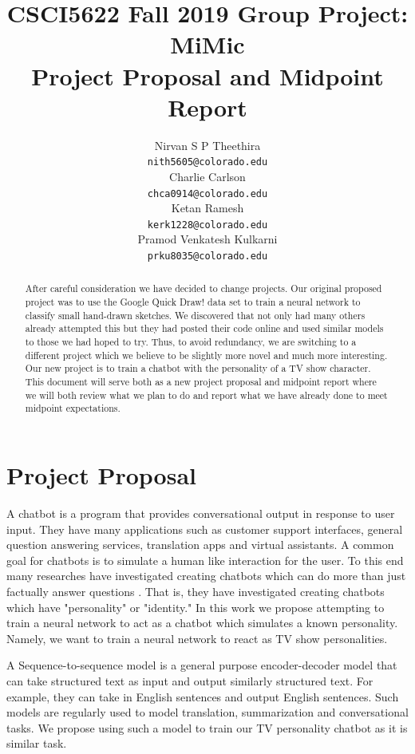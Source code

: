 \documentclass{article}
\title{CSCI5622 Fall 2019 Group Project: MiMic\\
       Project Proposal and Midpoint Report}
\author{%
  Nirvan S P Theethira\\
  \texttt{nith5605@colorado.edu} \\
  \And
  Charlie Carlson\\
  \texttt{chca0914@colorado.edu} \\
  \And
  Ketan Ramesh\\
  \texttt{kerk1228@colorado.edu} \\
  \And
  Pramod Venkatesh Kulkarni\\
  \texttt{prku8035@colorado.edu} \\
}
\begin{document}
 
\maketitle
 
\begin{abstract}
 After careful consideration we have decided to change projects.
 Our original proposed project was to use the Google Quick Draw! data set to train a neural network to classify small hand-drawn sketches.
 We discovered that not only had many others already attempted this but they had posted their code online and used similar models to those we had hoped to try.
 Thus, to avoid redundancy, we are switching to a different project which we believe to be slightly more novel and much more interesting. 
 Our new project is to train a chatbot with the personality of a TV show character.
 This document will serve both as a new project proposal and midpoint report where we will both review what we plan to do and report what we have already done to meet midpoint expectations.
\end{abstract}
 
\section{Project Proposal}
A chatbot is a program that provides conversational output in response to user input.
They have many applications such as customer support interfaces, general question answering services, translation apps and virtual assistants.
A common goal for chatbots is to simulate a human like interaction for the user.
To this end many researches have investigated creating chatbots which can do more than just factually answer questions \cite{Li2016, LINH2019, QianHZXZ17, ZhouHZZL17,NMC2017}.
That is, they have investigated creating chatbots which have "personality" or "identity."
In this work we propose attempting to train a neural network to act as a chatbot which simulates a known personality.
Namely, we want to train a neural network to react as TV show personalities.
 
A Sequence-to-sequence model is a general purpose encoder-decoder model that can take structured text as input and output similarly structured text.
For example, they can take in English sentences and output English sentences.
Such models are regularly used to model translation, summarization and conversational tasks.
We propose using such a model to train our TV personality chatbot as it is similar task.
 
\end{document}

